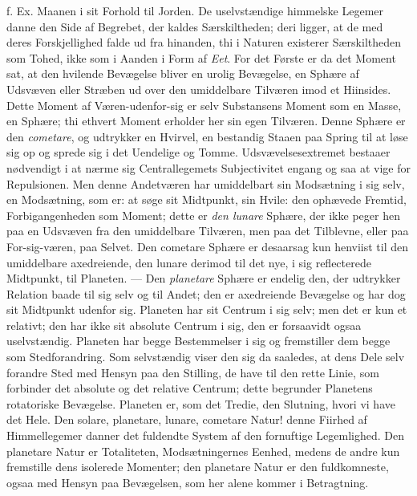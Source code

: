 \documentclass[12pt,a4paper]{book}
\begin{document}
f. Ex. Maanen i sit Forhold til Jorden. De uselvstændige himmelske Legemer
danne den Side af Begrebet, der kaldes Særskiltheden; deri ligger, at de med
deres Forskjellighed falde ud fra hinanden, thi i Naturen existerer
Særskiltheden som Tohed, ikke som i Aanden i Form af \emph{Eet}. For det Første
er da det Moment sat, at den hvilende Bevægelse bliver en urolig Bevægelse, en
Sphære af Udsvæven eller Stræben ud over den umiddelbare Tilværen imod et
Hiinsides. Dette Moment af Væren-udenfor-sig er selv Substansens Moment som en
Masse, en Sphære; thi ethvert Moment erholder her sin egen Tilværen. Denne
Sphære er den \emph{cometare}, og udtrykker en Hvirvel, en bestandig Staaen paa
Spring til at løse sig op og sprede sig i det Uendelige og Tomme.
Udsvævelsesextremet bestaaer nødvendigt i at nærme sig Centrallegemets
Subjectivitet engang og saa at vige for Repulsionen. Men denne Andetværen har
umiddelbart sin Modsætning i sig selv, en Modsætning, som er: at søge sit
Midtpunkt, sin Hvile: den ophævede Fremtid, Forbigangenheden som Moment; dette
er \emph{den lunare} Sphære, der ikke peger hen paa en Udsvæven fra den
umiddelbare Tilværen, men paa det Tilblevne, eller paa For-sig-væren, paa
Selvet. Den cometare Sphære er desaarsag kun henviist til den umiddelbare
axedreiende, den lunare derimod til det nye, i sig reflecterede Midtpunkt, til
Planeten. --- Den \emph{planetare} Sphære er endelig den, der udtrykker
Relation baade til sig selv og til Andet; den er axedreiende Bevægelse og har
dog sit Midtpunkt udenfor sig. Planeten har sit Centrum i sig selv; men det er
kun et relativt; den har ikke sit absolute Centrum i sig, den er forsaavidt
ogsaa
uselvstændig. Planeten har begge Bestemmelser i sig og fremstiller dem begge
som Stedforandring. Som selvstændig viser den sig da saaledes, at dens Dele
selv forandre Sted med Hensyn paa den Stilling, de have til den rette Linie,
som forbinder det absolute og det relative Centrum; dette begrunder Planetens
rotatoriske Bevægelse. Planeten er, som det Tredie, den Slutning, hvori vi have
det Hele. Den solare, planetare, lunare, cometare Natur! denne Fiirhed af
Himmellegemer danner det fuldendte System af den fornuftige Legemlighed. Den
planetare Natur er Totaliteten, Modsætningernes Eenhed, medens de andre kun
fremstille dens isolerede Momenter; den planetare Natur er den fuldkomneste,
ogsaa med Hensyn paa Bevægelsen, som her alene kommer i Betragtning.
\end{document}
